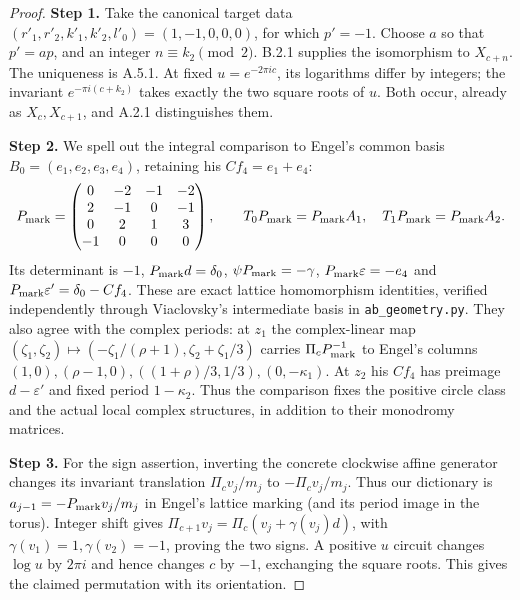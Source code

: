 \begin{proof}
\par\smallskip\noindent\textbf{Step 1.} Take the canonical target data $(r'_1,r'_2,k'_1,k'_2,l'_0)=(1,-1,0,0,0)$, for which $p'=-1$. Choose $a$ so that $p'=ap$, and an integer $n\equiv k_2\pmod2$. B.2.1 supplies the isomorphism to $X_{c+n}$. The uniqueness is A.5.1. At fixed $u=e^{-2\pi ic}$, its logarithms differ by integers; the invariant $e^{-\pi i(c+k_2)}$ takes exactly the two square roots of $u$. Both occur, already as $X_c,X_{c+1}$, and A.2.1 distinguishes them.

\par\smallskip\noindent\textbf{Step 2.} We spell out the integral comparison to Engel's common basis $B_0=(e_1,e_2,e_3,e_4)$, retaining his $C f_4=e_1+e_4$:
\[
 P_{\rm mark}=\begin{pmatrix}0&-2&-1&-2\\2&-1&0&-1\\0&2&1&3\\-1&0&0&0\end{pmatrix},\qquad
 T_0P_{\rm mark}=P_{\rm mark}A_1,\quad T_1P_{\rm mark}=P_{\rm mark}A_2.
\]
Its determinant is $-1$, $P_{\rm mark}d=\delta_0$, $\psi P_{\rm mark}=-\gamma$, $P_{\rm mark}\varepsilon=-e_4$ and $P_{\rm mark}\varepsilon'=\delta_0-Cf_4$. These are exact lattice homomorphism identities, verified independently through Viaclovsky's intermediate basis in \texttt{ab\_geometry.py}. They also agree with the complex periods: at $z_1$ the complex-linear map
$(\zeta_1,\zeta_2)\mapsto(-\zeta_1/(\rho+1),\zeta_2+\zeta_1/3)$ carries $\Pi_cP_{\rm mark}^{-1}$ to Engel's columns $(1,0),(\rho-1,0),((1+\rho)/3,1/3),(0,-\kappa_1)$. At $z_2$ his $Cf_4$ has preimage $d-\varepsilon'$ and fixed period $1-\kappa_2$. Thus the comparison fixes the positive circle class and the actual local complex structures, in addition to their monodromy matrices.

\par\smallskip\noindent\textbf{Step 3.} For the sign assertion, inverting the concrete clockwise affine generator changes its invariant translation $\Pi_cv_j/m_j$ to $-\Pi_cv_j/m_j$. Thus our dictionary is $a_{j-1}=-P_{\rm mark}v_j/m_j$ in Engel's lattice marking (and its period image in the torus). Integer shift gives $\Pi_{c+1}v_j=\Pi_c(v_j+\gamma(v_j)d)$, with $\gamma(v_1)=1,\gamma(v_2)=-1$, proving the two signs. A positive $u$ circuit changes $\log u$ by $2\pi i$ and hence changes $c$ by $-1$, exchanging the square roots. This gives the claimed permutation with its orientation.
\end{proof}

